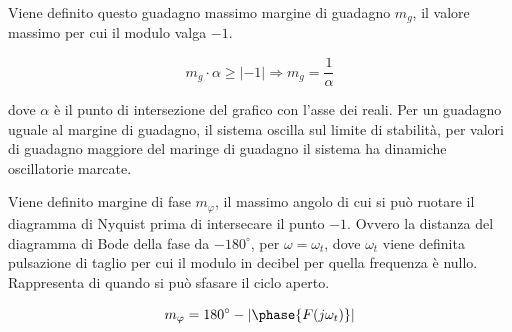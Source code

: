 \documentclass{article}
\numberwithin{equation}{subsection}
\begin{document}
Viene definito questo guadagno massimo margine di guadagno $m_g$, il valore massimo per cui il modulo valga $-1$. 

\begin{equation}
    m_g\cdot\alpha\geq|-1|\Rightarrow m_g=\displaystyle\frac{1}{\alpha}
\end{equation}

dove $\alpha$ è il punto di intersezione del grafico con l'asse dei reali. Per un guadagno uguale al margine di guadagno, il sistema oscilla sul limite di stabilità, 
per valori di guadagno maggiore del maringe di guadagno il sistema ha dinamiche oscillatorie marcate. 






Viene definito margine di fase $m_{\varphi}$, il massimo angolo di cui si può ruotare il diagramma di Nyquist prima di intersecare il punto $-1$. Ovvero la distanza del diagramma di Bode 
della fase da $-180^{\circ}$, per $\omega=\omega_t$, dove $\omega_t$ viene definita pulsazione di taglio per cui il modulo in decibel per quella frequenza è nullo. Rappresenta 
di quando si può sfasare il ciclo aperto. 

\begin{equation}
    m_{\varphi}=180^{\circ}-|\phase{F(j\omega_t)}|
\end{equation}




\begin{center}
\end{center}
\end{document}
